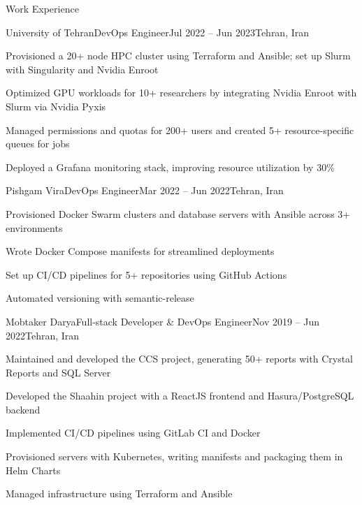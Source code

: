 \documentclass[]{main}
\begin{document}
\begin{section}{Work Experience}
 \begin{subsection}{University of Tehran}{DevOps Engineer}{Jul 2022 -- Jun 2023}{Tehran, Iran}
     \item Provisioned a 20+ node HPC cluster using Terraform and Ansible; set up Slurm with Singularity and Nvidia Enroot
     \item Optimized GPU workloads for 10+ researchers by integrating Nvidia Enroot with Slurm via Nvidia Pyxis
     \item Managed permissions and quotas for 200+ users and created 5+ resource-specific queues for jobs
     \item Deployed a Grafana monitoring stack, improving resource utilization by 30\%
 \end{subsection}

 \begin{subsection}{Pishgam Vira}{DevOps Engineer}{Mar 2022 -- Jun 2022}{Tehran, Iran}
     \item Provisioned Docker Swarm clusters and database servers with Ansible across 3+ environments
     \item Wrote Docker Compose manifests for streamlined deployments
     \item Set up CI/CD pipelines for 5+ repositories using GitHub Actions
     \item Automated versioning with semantic-release
 \end{subsection}

 \begin{subsection}{Mobtaker Darya}{Full-stack Developer \& DevOps Engineer}{Nov 2019 -- Jun 2022}{Tehran, Iran}
     \item Maintained and developed the CCS project, generating 50+ reports with Crystal Reports and SQL Server
     \item Developed the Shaahin project with a ReactJS frontend and Hasura/PostgreSQL backend
     \item Implemented CI/CD pipelines using GitLab CI and Docker
     \item Provisioned servers with Kubernetes, writing manifests and packaging them in Helm Charts
     \item Managed infrastructure using Terraform and Ansible
 \end{subsection}


\end{section}
\end{document}
